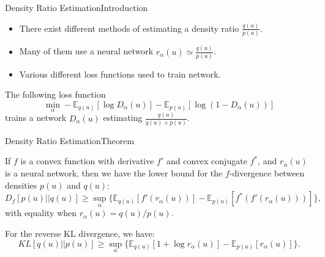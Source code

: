 \documentclass[handout]{beamer}
\newcommand{\E}{\mathbb{E}}
\begin{document}
\begin{frame}{Density Ratio Estimation}{Introduction}
\begin{itemize}
\item There exist different methods of estimating a density ratio $\frac{q(u)}{p(u)}$.
\item Many of them use a neural network $r_\alpha(u)\simeq \frac{q(u)}{p(u)}$.
\vspace{0.1cm}
\item Various different loss functions used to train network.
\end{itemize}
\begin{example}
The following loss function
\[\min_\alpha -\E_{q(u)}[\log D_\alpha(u)]-\E_{p(u)}[\log(1-D_\alpha(u))]\]
trains a network $D_\alpha(u)$ estimating $\frac{q(u)}{q(u)+p(u)}$.
\end{example}
\end{frame}
\begin{frame}{Density Ratio Estimation}{Theorem}
\begin{theorem}
If $f$ is a convex function with derivative $f'$ and convex conjugate $f^*$, and $r_\alpha(u)$ is a neural network, then we have the lower bound for the $f$-divergence between densities $p(u)$ and $q(u)$:
\[D_f [p(u)||q(u)]\geq \sup_{\alpha} \{\mathbb{E}_{q(u)}[f'(r_\alpha(u))]-\mathbb{E}_{p(u)}[f^*(f'(r_\alpha(u)))]\},\]
with equality when $r_\alpha(u)=q(u)/p(u)$.
\end{theorem}
\begin{example}
For the reverse KL divergence, we have:
\[KL[q(u)||p(u)]\geq \sup_{\alpha}\{\mathbb{E}_{q(u)}[1+\log r_\alpha(u)]-\mathbb{E}_{p(u)}[r_\alpha(u)]\}.\]
\end{example}
\end{frame}
\end{document}
